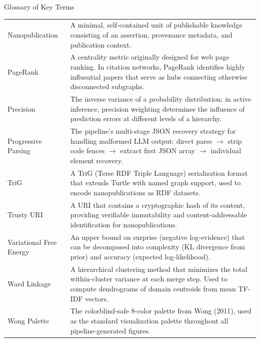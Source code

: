 \documentclass[
  ignorenonframetext,
]{beamer}
\begin{document}
\begin{frame}{Glossary of Key Terms}
\begin{longtable}{lp{12cm}}
Nanopublication & A minimal, self-contained unit of publishable knowledge consisting of an assertion, provenance metadata, and publication context. \\
PageRank & A centrality metric originally designed for web page ranking. In citation networks, PageRank identifies highly influential papers that serve as hubs connecting otherwise disconnected subgraphs. \\
Precision & The inverse variance of a probability distribution; in active inference, precision weighting determines the influence of prediction errors at different levels of a hierarchy. \\
Progressive Parsing & The pipeline's multi-stage JSON recovery strategy for handling malformed LLM output: direct parse $\to$ strip code fences $\to$ extract first JSON array $\to$ individual element recovery. \\
TriG & A TriG (Terse RDF Triple Language) serialization format that extends Turtle with named graph support, used to encode nanopublications as RDF datasets. \\
Trusty URI & A URI that contains a cryptographic hash of its content, providing verifiable immutability and content-addressable identification for nanopublications. \\
Variational Free Energy & An upper bound on surprise (negative log-evidence) that can be decomposed into complexity (KL divergence from prior) and accuracy (expected log-likelihood). \\
Ward Linkage & A hierarchical clustering method that minimizes the total within-cluster variance at each merge step. Used to compute dendrograms of domain centroids from mean TF-IDF vectors. \\
Wong Palette & The colorblind-safe 8-color palette from Wong (2011), used as the standard visualization palette throughout all pipeline-generated figures. \\
\end{longtable}
\end{frame}
\end{document}
